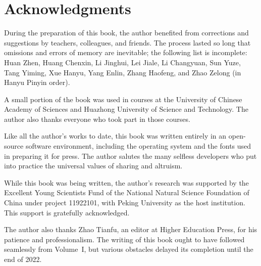 
\section*{Acknowledgments}
\hypertarget{o014.aljabr2.prelude.acknowledgments}{ }

During the preparation of this book, the author benefited from corrections and suggestions by teachers, colleagues, and friends. The process lasted so long that omissions and errors of memory are inevitable; the following list is incomplete: Huan Zhen, Huang Chenxin, Li Jinghui, Lei Jiale, Li Changyuan, Sun Yuze, Tang Yiming, Xue Hanyu, Yang Enlin, Zhang Haofeng, and Zhao Zelong (in Hanyu Pinyin order).

A small portion of the book was used in courses at the University of Chinese Academy of Sciences and Huazhong University of Science and Technology. The author also thanks everyone who took part in those courses.

Like all the author's works to date, this book was written entirely in an open-source software environment, including the operating system and the fonts used in preparing it for press. The author salutes the many selfless developers who put into practice the universal values of sharing and altruism.

While this book was being written, the author's research was supported by the Excellent Young Scientists Fund of the National Natural Science Foundation of China under project 11922101, with Peking University as the host institution. This support is gratefully acknowledged.

The author also thanks Zhao Tianfu, an editor at Higher Education Press, for his patience and professionalism. The writing of this book ought to have followed seamlessly from Volume~I, but various obstacles delayed its completion until the end of 2022.

